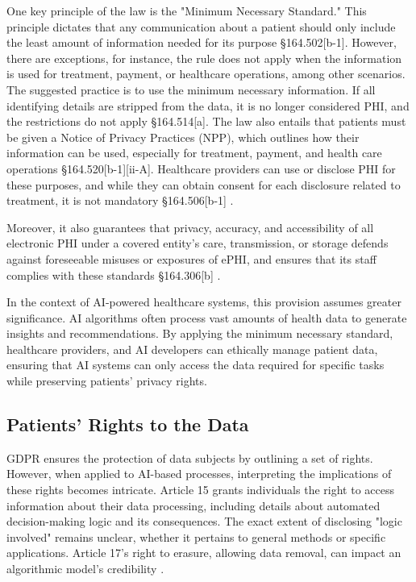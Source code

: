 \documentclass{article}
\begin{document}
One key principle of the law is the "Minimum Necessary Standard." This principle dictates that any communication about a patient should only include the least amount of information needed for its purpose §164.502[b-1]. However, there are exceptions, for instance, the rule does not apply when the information is used for treatment, payment, or healthcare operations, among other scenarios. The suggested practice is to use the minimum necessary information. If all identifying details are stripped from the data, it is no longer considered PHI, and the restrictions do not apply §164.514[a]. The law also entails that patients must be given a Notice of Privacy Practices (NPP), which outlines how their information can be used, especially for treatment, payment, and health care operations §164.520[b-1][ii-A]. Healthcare providers can use or disclose PHI for these purposes, and while they can obtain consent for each disclosure related to treatment, it is not mandatory §164.506[b-1] \cite{horner2005hipaa}.

Moreover, it also guarantees that privacy, accuracy, and accessibility of all electronic PHI under a covered entity's care, transmission, or storage defends against foreseeable misuses or exposures of ePHI, and ensures that its staff complies with these standards §164.306[b] \cite{hecker2014impact}.

In the context of AI-powered healthcare systems, this provision assumes greater significance. AI algorithms often process vast amounts of health data to generate insights and recommendations. By applying the minimum necessary standard, healthcare providers, and AI developers can ethically manage patient data, ensuring that AI systems can only access the data required for specific tasks while preserving patients' privacy rights.


\subsection{Patients’ Rights to the Data}
GDPR ensures the protection of data subjects by outlining a set of rights. However, when applied to AI-based processes, interpreting the implications of these rights becomes intricate. Article 15 grants individuals the right to access information about their data processing, including details about automated decision-making logic and its consequences. The exact extent of disclosing "logic involved" remains unclear, whether it pertains to general methods or specific applications.
Article 17's right to erasure, allowing data removal, can impact an algorithmic model's credibility \cite{wong2019right}. 
\end{document}

